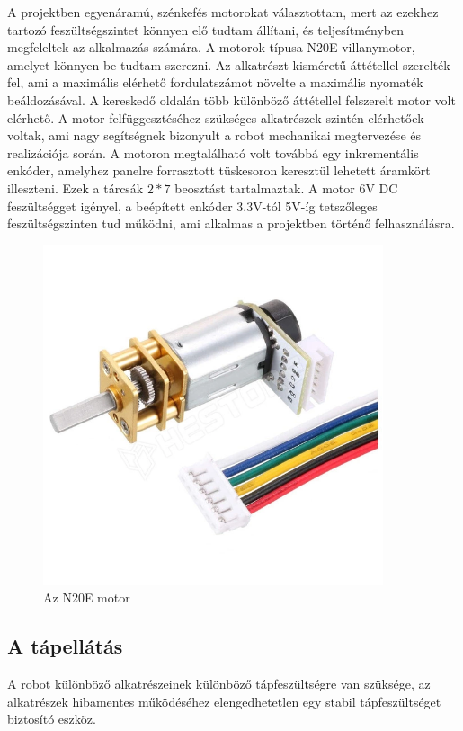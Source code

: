 A projektben egyenáramú, szénkefés motorokat választottam, mert az ezekhez
tartozó feszültségszintet könnyen elő tudtam állítani, és teljesítményben
megfeleltek az alkalmazás számára. A motorok típusa N20E villanymotor, amelyet
könnyen be tudtam szerezni. Az alkatrészt kisméretű áttétellel szerelték fel, ami
a maximális elérhető fordulatszámot növelte a maximális nyomaték beáldozásával. A
kereskedő oldalán több különböző áttétellel felszerelt motor volt elérhető.  A
motor felfüggesztéséhez szükséges alkatrészek szintén elérhetőek voltak, ami nagy
segítségnek bizonyult a robot mechanikai megtervezése és realizációja során. A
motoron megtalálható volt továbbá egy inkrementális enkóder, amelyhez panelre
forrasztott tüskesoron keresztül lehetett áramkört illeszteni. Ezek a tárcsák \(2
* 7\) beosztást tartalmaztak. A motor 6V DC feszültségget igényel, a beépített
enkóder 3.3V-tól 5V-íg tetszőleges feszültségszinten tud működni, ami alkalmas a
projektben történő felhasználásra.

\begin{figure}
  \centering
  \includegraphics[width=100mm, keepaspectratio]{figures/ch1/motor.png}
  \caption{Az N20E motor\cite{n20emotor}}
  \label{fig:motor}
\end{figure}

\subsection{A tápellátás}

A robot különböző alkatrészeinek különböző tápfeszültségre van szüksége, az
alkatrészek hibamentes működéséhez elengedhetetlen egy stabil tápfeszültséget
biztosító eszköz.

